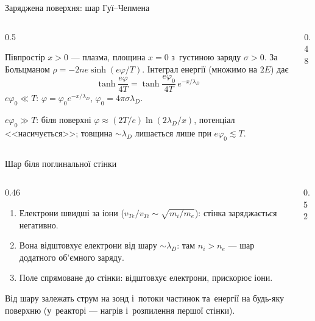 \documentclass[]{beamer}
\newcommand{\fig}[2][\linewidth]{\resizebox{#1}{!}{}}
\begin{document}
\begin{frame}{Заряджена поверхня: шар Гуї--Чепмена}
	\begin{columns}[T]
		\begin{column}{0.5\linewidth}
			\begin{block}{}\justifying\scriptsize
				Півпростір $x>0$ --- плазма, площина $x=0$ з~густиною заряду $\sigma>0$. За Больцманом
				$\rho=-2ne\sinh(e\varphi/T)$. Інтеграл енергії (множимо на $2E$) дає
				\begin{equation*}
					\tanh\frac{e\varphi}{4T}=\tanh\frac{e\varphi_0}{4T}\,e^{-x/\lambda_D}
				\end{equation*}
				$e\varphi_0\ll T$: $\varphi=\varphi_0e^{-x/\lambda_D}$, $\varphi_0=4\pi\sigma\lambda_D$.
			\end{block}
			\begin{alertblock}{}\justifying\scriptsize
				$e\varphi_0\gg T$: біля поверхні $\varphi\approx(2T/e)\ln(2\lambda_D/x)$, потенціал <<насичується>>; товщина
				$\sim\lambda_D$ лишається лише при $e\varphi_0\lesssim T$.
			\end{alertblock}
		\end{column}
		\begin{column}{0.48\linewidth}
			\fig{debye-layer.tikz}
		\end{column}
	\end{columns}
\end{frame}

\begin{frame}{Шар біля поглинальної стінки}
	\begin{columns}[T]
		\begin{column}{0.46\linewidth}
			\begin{enumerate}\justifying\scriptsize
				\item Електрони швидші за іони ($v_{Te}/v_{Ti}\sim\sqrt{m_i/m_e}$): стінка заряджається \alert{негативно}.
				\item Вона відштовхує електрони від шару $\sim\lambda_D$: там $n_i>n_e$ --- шар додатного об'ємного заряду.
				\item Поле спрямоване до стінки: відштовхує електрони, прискорює іони.
			\end{enumerate}
			\begin{block}{}\justifying\scriptsize
				Від шару залежать струм на зонд і~потоки частинок та~енергії на будь-яку поверхню (у~реакторі --- нагрів і~розпилення першої стінки).
			\end{block}
		\end{column}
		\begin{column}{0.52\linewidth}
			\fig{sheath.tikz}
		\end{column}
	\end{columns}
\end{frame}
\end{document}

